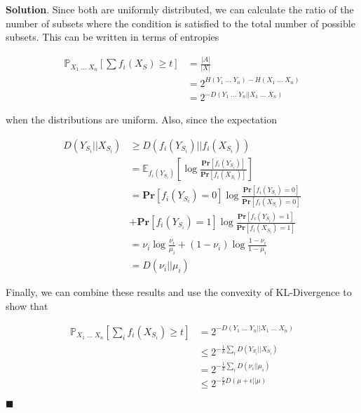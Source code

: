 \documentclass[12pt]{article}
\theoremstyle{definition}
\newenvironment{s}{%
        \begin{trivlist} \item \textbf{Solution}. }{%
            \hspace*{\fill} $\blacksquare$\end{trivlist}}%
\begin{document}
{\begin{s}
Since both are uniformly distributed, we can calculate the ratio of the number of subsets where the condition is satisfied to the total number of possible subsets. This can be written in terms of entropies

\begin{align*}
\mathbb{P}_{X_{1}\; ... \; X_{n}} \left[\sum f_{i}(X_{S}) \geq t\right] &= \frac{|A|}{|X|} \\
&= 2^{H(Y_{1} \; ... \; Y_{n}) - H(X_{1} \; ... \; X_{n})}\\
&= 2^{-D(Y_{1} \; ... \; Y_{n}||X_{1} \; ... \; X_{n})}
\end{align*}

when the distributions are uniform. Also, since the expectation 

\begin{align*}
D(Y_{S_{i}}||X_{S_{i}}) &\geq D(f_{i}(Y_{S_{i}})||f_{i}(X_{S_{i}})) \\
&= \mathbb{E}_{f_{i}(Y_{S_{i}})}\left[\log\frac{\mathbf{Pr}[f_{i}(Y_{S_{i}})]}{\mathbf{Pr}[f_{i}(X_{S_{i}})]} \right]\\
&= \mathbf{Pr}[f_{i}(Y_{S_{i}})=0]\log\frac{\mathbf{Pr}[f_{i}(Y_{S_{i}})=0]}{\mathbf{Pr}[f_{i}(X_{S_{i}})=0]} \\
&+ \mathbf{Pr}[f_{i}(Y_{S_{i}})=1]\log\frac{\mathbf{Pr}[f_{i}(Y_{S_{i}})=1]}{\mathbf{Pr}[f_{i}(X_{S_{i}})=1]}\\
&= \nu_{i}\log \frac{\nu_{i}}{\mu_{i}} + (1-\nu_{i})\log \frac{1-\nu_{i}}{1-\mu_{i}}\\
&= D(\nu_{i}||\mu_{i})
\end{align*}

Finally, we can combine these results and use the convexity of KL-Divergence to show that

\begin{align*}
\mathbb{P}_{X_{1}\; ... \; X_{n}} \left[\sum_{i} f_{i}(X_{S_{i}}) \geq t\right] &= 2^{-D(Y_{1} \; ... \; Y_{n}||X_{1} \; ... \; X_{n})}\\
&\leq 2^{-\frac{1}{k}\sum_{i} D(Y_{S_{i}}||X_{S_{i}})}\\
&= 2^{-\frac{1}{k}\sum_{i} D(\nu_{i}||\mu_{i})}\\
&\leq 2^{-\frac{r}{k}D(\mu + \epsilon||\mu)}
\end{align*}


\end{s}
\end{document}
